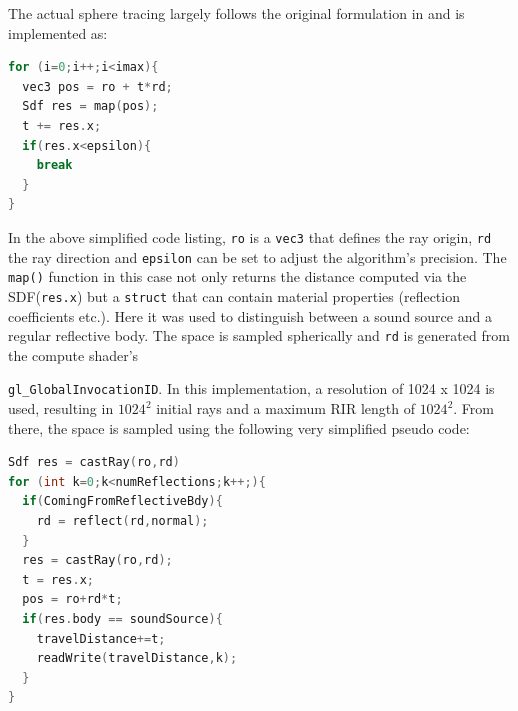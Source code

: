 \documentclass[twoside,a4paper]{article}
\begin{document}
The actual sphere tracing largely follows the original formulation in \cite{hart_sphere_1996} and is implemented as:

\begin{lstlisting}[language=C, caption={\it GLSL pseudo code for sphere tracing},captionpos=b,label=lst:sphereTrace]
for (i=0;i++;i<imax){
  vec3 pos = ro + t*rd;
  Sdf res = map(pos);
  t += res.x;
  if(res.x<epsilon){
    break
  }
}
\end{lstlisting} 

In the above simplified code listing, \texttt{ro} is a \texttt{vec3} that defines the ray origin, \texttt{rd} the ray direction and \texttt{epsilon} can be set to adjust the algorithm's precision. The \texttt{map()} function in this case not only returns the distance computed via the SDF(\texttt{res.x}) but a \texttt{struct} that can contain material properties (reflection coefficients etc.). Here it was used to distinguish between a sound source and a regular reflective body.
The space is sampled spherically and \texttt{rd} is generated from the compute shader's \

 \texttt{gl\_GlobalInvocationID}. In this implementation, a resolution of 1024 x 1024 is used, resulting in $1024^2$ initial rays and a maximum RIR length of $1024^2$.
From there, the space is sampled using the following very simplified pseudo code:
\begin{lstlisting}[language=C, caption={\it GLSL pseudo code for sampling the space and writing to the RIR.},captionpos=b, label=lst:mainloop]
Sdf res = castRay(ro,rd)
for (int k=0;k<numReflections;k++;){
  if(ComingFromReflectiveBdy){
    rd = reflect(rd,normal);
  }
  res = castRay(ro,rd);
  t = res.x;
  pos = ro+rd*t;
  if(res.body == soundSource){
    travelDistance+=t;
    readWrite(travelDistance,k);
  }
}

\end{lstlisting}
\end{document}
